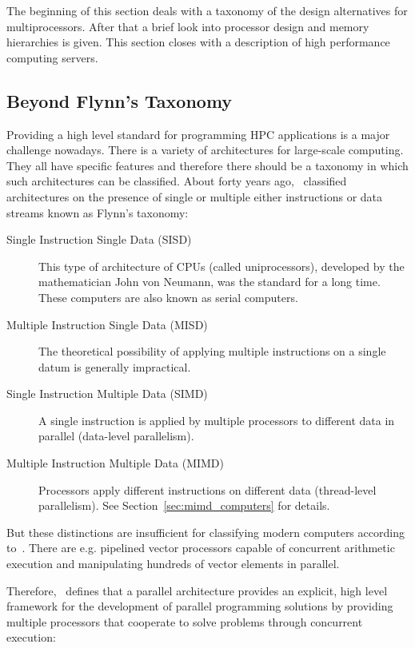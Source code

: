 The beginning of this section deals with a taxonomy of
the design alternatives for multiprocessors. After that a brief look
into processor design and memory hierarchies is given. This section
closes with a description of high performance computing servers.

\subsection{Beyond Flynn's Taxonomy}
\label{sec:flynn}
Providing a high level standard for programming HPC applications is a
major challenge nowadays. There is a variety of architectures for
large-scale computing. They all have specific features and 
therefore there should be a taxonomy in which such architectures can
be classified. About forty years ago, \cite{flynn72sco}~classified
architectures on the
presence of single or multiple either instructions or data streams
known as Flynn's taxonomy:
\begin{description}
\item[Single Instruction Single Data (SISD)]
  This type of architecture of CPUs (called uniprocessors),
  developed by the 
  mathematician John von Neumann, was the standard for a long
  time. These computers are also known as serial computers. 
\item[Multiple Instruction Single Data (MISD)] The theoretical possibility
  of applying multiple instructions on a single datum is generally
  impractical.
\item[Single Instruction Multiple Data (SIMD)] 
  A single instruction is applied by multiple processors to different
  data in parallel (data-level parallelism). 
\item[Multiple Instruction Multiple Data (MIMD)] Processors apply
  different instructions on different data (thread-level
  parallelism). See Section~\ref{sec:mimd_computers} for details. 
\end{description}

But these distinctions are insufficient for classifying modern
computers according to~\cite{duncan90survey}. There are e.g.
pipelined vector processors capable of concurrent arithmetic execution
and manipulating hundreds of vector elements in parallel.

Therefore,~\cite{duncan90survey} defines that a parallel architecture
provides an explicit, high level framework for 
the development of parallel programming solutions by providing
multiple processors that cooperate to solve problems through
concurrent execution:

